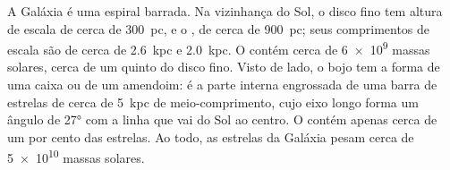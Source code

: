 A Galáxia é uma espiral barrada. Na vizinhança do Sol, o disco fino tem
altura de escala de cerca de \qty{300}{pc}, e o , de cerca de
\qty{900}{pc}; seus comprimentos de escala são de cerca de \qty{2.6}{kpc} e
\qty{2.0}{kpc}. O  contém cerca de \num{6e9} massas solares,
cerca de um quinto do disco fino. Visto de lado, o bojo tem a forma de uma caixa
ou de um amendoim: é a parte interna engrossada de uma barra de estrelas de cerca de
\qty{5}{kpc} de meio-comprimento, cujo eixo longo forma um ângulo de
\ang{27} com a linha que vai do Sol ao centro. O  contém
apenas cerca de um por cento das estrelas. Ao todo, as estrelas da Galáxia
pesam cerca de \num{5e10} massas solares.


